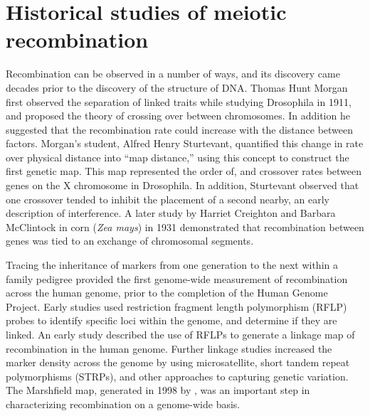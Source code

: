 


\section{Historical studies of meiotic recombination}

Recombination can be observed in a number of ways, and its discovery came decades prior to the discovery of the structure of DNA.
Thomas Hunt Morgan first observed the separation of linked traits while studying Drosophila in 1911\cite{Morgan1911}, and proposed the theory of crossing over between chromosomes.
In addition he suggested that the recombination rate could increase with the distance between factors.
Morgan's student, Alfred Henry Sturtevant, quantified this change in rate over physical distance into ``map distance,'' using this concept to construct the first genetic map.
This map represented the order of, and crossover rates between genes on the X chromosome in Drosophila\cite{Sturtevant1913}.
In addition, Sturtevant observed that one crossover tended to inhibit the placement of a second nearby, an early description of interference.
A later study by Harriet Creighton and Barbara McClintock in corn (\textit{Zea mays}) in 1931 demonstrated that recombination between genes was tied to an exchange of chromosomal segments\cite{Creighton1931}.

Tracing the inheritance of markers from one generation to the next within a family pedigree provided the first genome-wide measurement of recombination across the human genome, prior to the completion of the Human Genome Project.
Early studies used restriction fragment length polymorphism (RFLP) probes to identify specific loci within the genome, and determine if they are linked.
An early study described the use of RFLPs to generate a linkage map of recombination in the human genome\cite{Botstein1980}.
Further linkage studies increased the marker density across the genome by using microsatellite, short tandem repeat polymorphisms (STRPs), and other approaches to capturing genetic variation\cite{Morton1991,Matise1994,Dib1996}.
The Marshfield map, generated in 1998 by \citet{Broman1998}, was an important step in characterizing recombination on a genome-wide basis.


